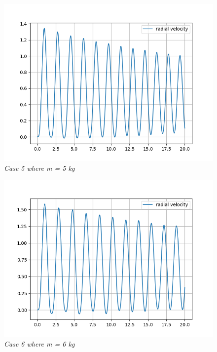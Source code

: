         \begin{figure}[H]
            \centering
            \includegraphics{Appendix/RSimPictures/R/rm5.png}
            \caption{\textit{Case 5 where m = 5 kg}}
            \label{}
        \end{figure}
            
        \begin{figure}
            \centering
            \includegraphics{Appendix/RSimPictures/R/rm6.png}
            \caption{\textit{Case 6 where m = 6 kg}}
            \label{}
        \end{figure}
            
